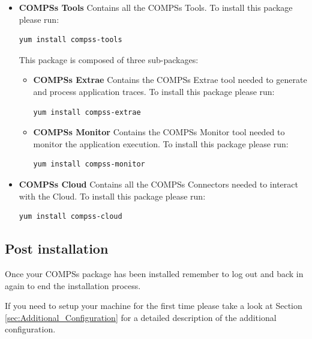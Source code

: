 \begin{itemize}
 \item \textbf{COMPSs Tools} \newline
       Contains all the COMPSs Tools.
       \newline
       To install this package please run:
       \begin{lstlisting}[language=bash]
	  yum install compss-tools
       \end{lstlisting}
       This package is composed of three sub-packages:
       \begin{itemize}
        \item \textbf{COMPSs Extrae} \newline
	      Contains the COMPSs Extrae tool needed to generate and process application traces.
	      \newline
	      To install this package please run:
	      \begin{lstlisting}[language=bash]
		  yum install compss-extrae
	      \end{lstlisting}
        \item \textbf{COMPSs Monitor} \newline
              Contains the COMPSs Monitor tool needed to monitor the application execution. 
              \newline
	      To install this package please run:
	      \begin{lstlisting}[language=bash]
		  yum install compss-monitor
	      \end{lstlisting}
       \end{itemize}

 \item \textbf{COMPSs Cloud} \newline
       Contains all the COMPSs Connectors needed to interact with the Cloud.
       \newline
       To install this package please run:
       \begin{lstlisting}[language=bash]
	  yum install compss-cloud
       \end{lstlisting}
\end{itemize} 

\subsection{Post installation}
Once your COMPSs package has been installed remember to log out and back in again to end the installation process.

If you need to setup your machine for the first time please take a look at Section \ref{sec:Additional_Configuration} for a 
detailed description of the additional configuration. 